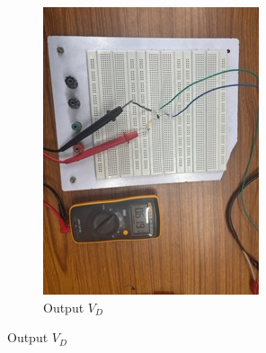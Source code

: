 \documentclass[12pt,a4paper]{article}
\begin{document}
\begin{figure}[h!]
\begin{subfigure}[b]{0.48\linewidth}
    \includegraphics[angle=90, width=\textwidth]{Experiment_5/figs/iv_ckt_1 Small.jpeg}
    \caption{Output $V_D$}
\end{subfigure}
\end{figure}
\end{document}
